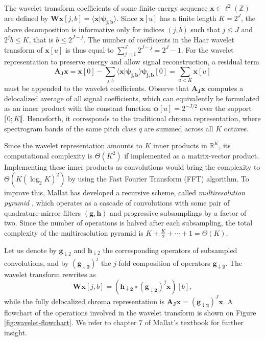 \documentclass{article}
\begin{document}
The wavelet transform coefficients of some finite-energy sequence
$\boldsymbol{x} \in \ell^2(\mathbb{Z})$ are defined by
$\boldsymbol{Wx}[j, b] = \langle \boldsymbol{x} \vert \boldsymbol{\psi_{j,b}} \rangle$.
Since $\boldsymbol{x}[u]$ has a finite length $K = 2^J$, the above decomposition is informative
only for indices $(j, b)$ such that $j \leq J$ and $2^j b \leq K$, that is $b\leq2^{J-j}$.
The number of coefficients in the Haar wavelet transform of $\boldsymbol{x}[u]$ is thus equal to
$\sum_{j =1}^{J} 2^{J-j} = 2^J - 1$. For the wavelet representation to
preserve energy and allow signal reconstruction, a residual term
\begin{equation}
\boldsymbol{A_J x}
= \boldsymbol{x}[0] -
\sum_{j,b}
\langle \boldsymbol{x} \vert \boldsymbol{\psi_{j,b}} \rangle \boldsymbol{\psi_{j,b}}[0]
= \sum_{u<K} \boldsymbol{x}[u]
\label{eq:lowpass-term}
\end{equation}
must be appended to the wavelet coefficients.
Observe that $\boldsymbol{A_J x}$ computes a delocalized average of all signal
coefficients, which can equivalently be formulated as an inner product with the constant
function $\boldsymbol{\phi}[u] = 2^{-J/2}$ over the support $\llbracket 0 ; K \llbracket$.
Henceforth, it corresponds to the traditional chroma representation, where spectrogram bands
of the same pitch class $q$ are summed across all $K$ octaves.


Since the wavelet representation amounts to $K$ inner products in $\mathbb{R}^K$,
its computational complexity is $\Theta(K^2)$ if implemented as a matrix-vector product.
Implementing these inner products as convolutions would bring the complexity to
$\Theta{(K (\log_2 K)^2)}$ by using the Fast Fourier Transform (FFT) algorithm.
To improve this, Mallat has developed a recursive scheme, called
\emph{multiresolution pyramid} \cite{mallat1989theory}, which operates as a cascade
of convolutions with some pair of quadrature mirror filters
$(\boldsymbol{g}, \boldsymbol{h})$ and progressive subsamplings by a factor of two.
Since the number of operations is halved after each subsampling, the total
complexity of the multiresolution pyramid is $K + \frac{K}{2} + \cdots + 1 = \Theta(K)$.

Let us denote by $\boldsymbol{g}_{\downarrow 2}$ and
$\boldsymbol{h}_{\downarrow 2}$ the corresponding operators of subsampled
convolutions, and by $(\boldsymbol{g_{\downarrow 2}})^j$ the $j$-fold composition
of operators $\boldsymbol{g_{\downarrow 2}}$.
The wavelet transform rewrites as
\begin{equation}
\boldsymbol{Wx}[j,b] =
\left(
\boldsymbol{h_{\downarrow 2}} \circ
(\boldsymbol{g_{\downarrow 2}})^j \boldsymbol{x}
\right)[b],
\end{equation}
while the fully delocalized chroma representation is
$\boldsymbol{A_J x} =
(\boldsymbol{g_{\downarrow 2}})^J \boldsymbol{x}$.
A flowchart of the operations involved in the wavelet transform is shown on
Figure \ref{fig:wavelet-flowchart}.
We refer to chapter 7 of Mallat's textbook \cite{mallat2008wavelet}
for further insight.
\end{document}
